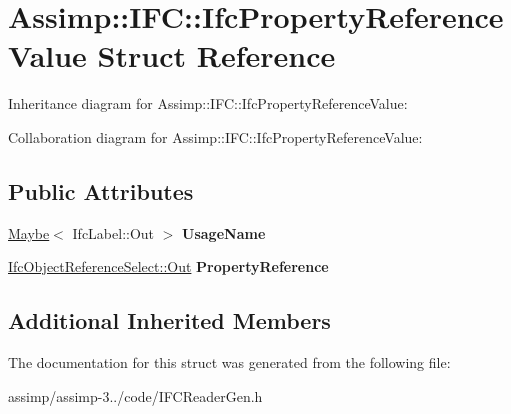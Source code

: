 \hypertarget{struct_assimp_1_1_i_f_c_1_1_ifc_property_reference_value}{\section{Assimp\+:\+:I\+F\+C\+:\+:Ifc\+Property\+Reference\+Value Struct Reference}
\label{struct_assimp_1_1_i_f_c_1_1_ifc_property_reference_value}
}


Inheritance diagram for Assimp\+:\+:I\+F\+C\+:\+:Ifc\+Property\+Reference\+Value\+:


Collaboration diagram for Assimp\+:\+:I\+F\+C\+:\+:Ifc\+Property\+Reference\+Value\+:
\subsection*{Public Attributes}
\begin{DoxyCompactItemize}
\item 
\hypertarget{struct_assimp_1_1_i_f_c_1_1_ifc_property_reference_value_a95c944f5930f4b28dbd5bab233dfd5a5}{\hyperlink{struct_assimp_1_1_s_t_e_p_1_1_maybe}{Maybe}$<$ Ifc\+Label\+::\+Out $>$ {\bfseries Usage\+Name}}\label{struct_assimp_1_1_i_f_c_1_1_ifc_property_reference_value_a95c944f5930f4b28dbd5bab233dfd5a5}

\item 
\hypertarget{struct_assimp_1_1_i_f_c_1_1_ifc_property_reference_value_a1fbc28233d968c65a305661621fa57c7}{\hyperlink{classboost_1_1shared__ptr}{Ifc\+Object\+Reference\+Select\+::\+Out} {\bfseries Property\+Reference}}\label{struct_assimp_1_1_i_f_c_1_1_ifc_property_reference_value_a1fbc28233d968c65a305661621fa57c7}

\end{DoxyCompactItemize}
\subsection*{Additional Inherited Members}


The documentation for this struct was generated from the following file\+:\begin{DoxyCompactItemize}
\item 
assimp/assimp-\/3../code/I\+F\+C\+Reader\+Gen.\+h\end{DoxyCompactItemize}
